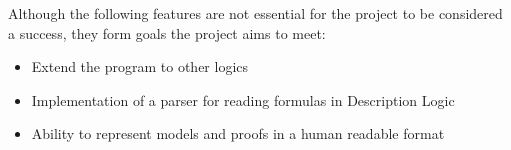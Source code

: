 
Although the following features are not essential for the project to be considered a success, they
form goals the project aims to meet:

\begin{itemize}
\item Extend the program to other logics
\item Implementation of a parser for reading formulas in Description Logic
\item Ability to represent models and proofs in a human readable format
\end{itemize}
